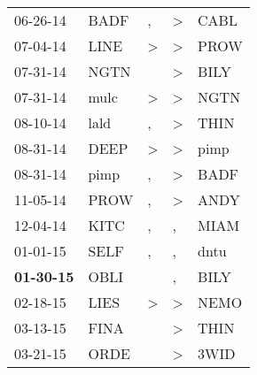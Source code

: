\begin{supertabular}{p{0.07\textwidth}p{0.06\textwidth}p{0.02\textwidth}p{0.02\textwidth}p{0.06\textwidth}}
          06-26-14\textsuperscript{} &           BADF\textsuperscript{} &                , &     \textgreater &           CABL\textsuperscript{} \\
          07-04-14\textsuperscript{} &           LINE\textsuperscript{} &     \textgreater &     \textgreater &           PROW\textsuperscript{} \\
          07-31-14\textsuperscript{} &           NGTN\textsuperscript{} &                  &     \textgreater &           BILY\textsuperscript{} \\
          07-31-14\textsuperscript{} &           mulc\textsuperscript{} &     \textgreater &     \textgreater &           NGTN\textsuperscript{} \\
          08-10-14\textsuperscript{} &           lald\textsuperscript{} &                , &     \textgreater &           THIN\textsuperscript{} \\
          08-31-14\textsuperscript{} &           DEEP\textsuperscript{} &     \textgreater &     \textgreater &           pimp\textsuperscript{} \\
          08-31-14\textsuperscript{} &           pimp\textsuperscript{} &                , &     \textgreater &           BADF\textsuperscript{} \\
          11-05-14\textsuperscript{} &           PROW\textsuperscript{} &                , &     \textgreater &           ANDY\textsuperscript{} \\
          12-04-14\textsuperscript{} &           KITC\textsuperscript{} &                , &                , &           MIAM\textsuperscript{} \\
          01-01-15\textsuperscript{} &           SELF\textsuperscript{} &                , &                , &           dntu\textsuperscript{} \\
 \textbf{01-30-15\textsuperscript{}} &           OBLI\textsuperscript{} &                  &                , &           BILY\textsuperscript{} \\
          02-18-15\textsuperscript{} &           LIES\textsuperscript{} &     \textgreater &     \textgreater &           NEMO\textsuperscript{} \\
          03-13-15\textsuperscript{} &           FINA\textsuperscript{} &                  &     \textgreater &           THIN\textsuperscript{} \\
          03-21-15\textsuperscript{} &           ORDE\textsuperscript{} &                  &     \textgreater &           3WID\textsuperscript{} \\

\end{supertabular}
